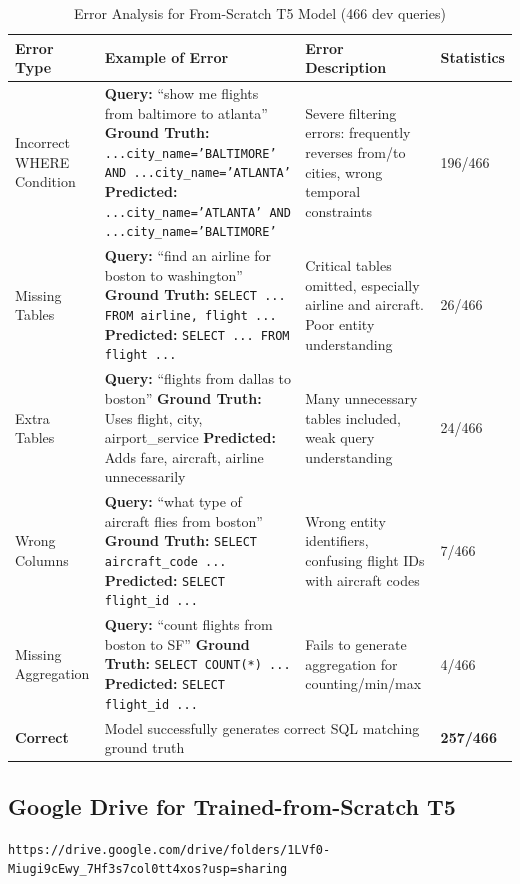 \documentclass{article}
\begin{document}
\begin{table}[h]
\centering
\small
\caption{Error Analysis for From-Scratch T5 Model (466 dev queries)}
\label{tab:error_analysis_scr}
\begin{tabular}{p{2.5cm}p{5cm}p{3.5cm}p{1.5cm}}
\toprule
\textbf{Error Type} & \textbf{Example of Error} & \textbf{Error Description} & \textbf{Statistics} \\
\midrule

Incorrect WHERE Condition & 
\textbf{Query:} ``show me flights from baltimore to atlanta''
\newline
\textbf{Ground Truth:} \texttt{...city\_name='BALTIMORE' AND ...city\_name='ATLANTA'}
\newline
\textbf{Predicted:} \texttt{...city\_name='ATLANTA' AND ...city\_name='BALTIMORE'} &
Severe filtering errors: frequently reverses from/to cities, wrong temporal constraints &
196/466 \\

\midrule

Missing Tables & 
\textbf{Query:} ``find an airline for boston to washington''
\newline
\textbf{Ground Truth:} \texttt{SELECT ... FROM airline, flight ...}
\newline
\textbf{Predicted:} \texttt{SELECT ... FROM flight ...} &
Critical tables omitted, especially airline and aircraft. Poor entity understanding &
26/466 \\

\midrule

Extra Tables & 
\textbf{Query:} ``flights from dallas to boston''
\newline
\textbf{Ground Truth:} Uses flight, city, airport\_service
\newline
\textbf{Predicted:} Adds fare, aircraft, airline unnecessarily &
Many unnecessary tables included, weak query understanding &
24/466 \\

\midrule

Wrong Columns & 
\textbf{Query:} ``what type of aircraft flies from boston''
\newline
\textbf{Ground Truth:} \texttt{SELECT aircraft\_code ...}
\newline
\textbf{Predicted:} \texttt{SELECT flight\_id ...} &
Wrong entity identifiers, confusing flight IDs with aircraft codes &
7/466 \\

\midrule

Missing Aggregation & 
\textbf{Query:} ``count flights from boston to SF''
\newline
\textbf{Ground Truth:} \texttt{SELECT COUNT(*) ...}
\newline
\textbf{Predicted:} \texttt{SELECT flight\_id ...} &
Fails to generate aggregation for counting/min/max &
4/466 \\

\midrule
\textbf{Correct} & 
\multicolumn{2}{l}{Model successfully generates correct SQL matching ground truth} &
\textbf{257/466} \\

\bottomrule
\end{tabular}
\end{table}

\subsection*{Google Drive for Trained-from-Scratch T5}
\nolinkurl{https://drive.google.com/drive/folders/1LVf0-Miugi9cEwy_7Hf3s7col0tt4xos?usp=sharing}
\end{document}
